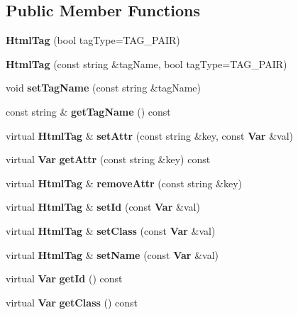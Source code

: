 \subsection*{Public Member Functions}
\begin{CompactItemize}
\item 
\textbf{HtmlTag} (bool tagType=TAG\_\-PAIR)\label{classHtmlTag_62eb3105ee2592c4564cba840bf5dffb}

\item 
\textbf{HtmlTag} (const string \&tagName, bool tagType=TAG\_\-PAIR)\label{classHtmlTag_0076758379d841b014185a0baf664ba2}

\item 
void \textbf{setTagName} (const string \&tagName)\label{classHtmlTag_b175e70bde14ba15d160c7361fc08cde}

\item 
const string \& \textbf{getTagName} () const \label{classHtmlTag_46a1b30ccc0ee7e2a2942dd0d42b5a46}

\item 
virtual {\bf HtmlTag} \& \textbf{setAttr} (const string \&key, const {\bf Var} \&val)\label{classHtmlTag_6a1edcd9d1b0e3c3fab774f6874feb50}

\item 
virtual {\bf Var} \textbf{getAttr} (const string \&key) const \label{classHtmlTag_ab12ea73f5395b06873fc0d65b008a9f}

\item 
virtual {\bf HtmlTag} \& \textbf{removeAttr} (const string \&key)\label{classHtmlTag_dbb6d35fc0e7ea11a8e9b850884a4fa7}

\item 
virtual {\bf HtmlTag} \& \textbf{setId} (const {\bf Var} \&val)\label{classHtmlTag_3fadb90a3435758cebad17dd6c4e2d7a}

\item 
virtual {\bf HtmlTag} \& \textbf{setClass} (const {\bf Var} \&val)\label{classHtmlTag_7a6a5a4479f7e67f0796e3bc7c67b4d9}

\item 
virtual {\bf HtmlTag} \& \textbf{setName} (const {\bf Var} \&val)\label{classHtmlTag_43f09e229a49a26bb54425d84339c5c9}

\item 
virtual {\bf Var} \textbf{getId} () const \label{classHtmlTag_1698a6303bda5226627b0291c1da7b27}

\item 
virtual {\bf Var} \textbf{getClass} () const \label{classHtmlTag_6852dbba1ff504500796eb22f67d25b2}


\end{CompactItemize}

